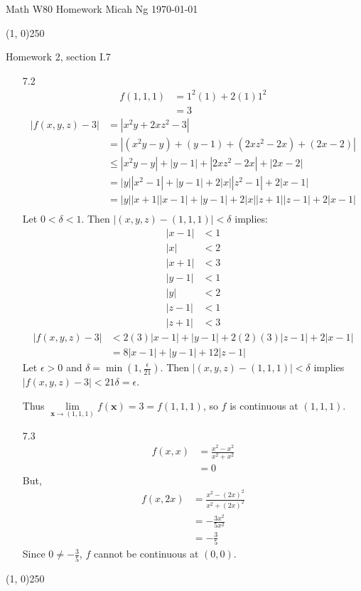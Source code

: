 \documentclass[11pt,letterpaper]{article}
\begin{document}
\noindent
Math W80 Homework \hfill Micah Ng \hfill \today

\begin{center}
\line(1, 0){250}
\end{center}

\noindent
Homework 2, section I.7

\begin{enumerate}
\item[7.2]
  \begin{align*}
    f(1,1,1) &= 1^2(1)+2(1)1^2 \\
        &= 3
  \end{align*}
  \begin{align*}
    |f(x,y,z)-3| &= \left|x^2y+2xz^2-3\right| \\
        &= \left|\left(x^2y-y\right)+(y-1)+\left(2xz^2-2x\right)+(2x-2)\right| \\
        &\leq \left|x^2y-y\right|+|y-1|+\left|2xz^2-2x\right|+|2x-2| \\
        &= |y|\left|x^2-1\right|+|y-1|+2|x|\left|z^2-1\right|+2|x-1| \\
        &= |y||x+1||x-1|+|y-1|+2|x||z+1||z-1|+2|x-1| \\
  \end{align*}
  Let $0<\delta<1$. Then $|(x,y,z)-(1,1,1)|<\delta$ implies:
  \begin{align*}
    |x-1| &< 1 \\
    |x| &< 2 \\
    |x+1| &< 3 \\
    |y-1| &< 1 \\
    |y| &< 2 \\
    |z-1| &< 1 \\
    |z+1| &< 3
  \end{align*}
  \begin{align*}
    |f(x,y,z)-3| &< 2(3)|x-1|+|y-1|+2(2)(3)|z-1|+2|x-1| \\
        &= 8|x-1|+|y-1|+12|z-1|
  \end{align*}
  Let $\epsilon>0$ and $\delta=\min\left(1,\frac{\epsilon}{21}\right)$. Then
  $|(x,y,z)-(1,1,1)|<\delta$ implies $|f(x,y,z)-3|<21\delta=\epsilon$.

  Thus $\lim\limits_{\mathbf{x}\to(1,1,1)}f(\mathbf{x})=3=f(1,1,1)$, so $f$ is
  continuous at $(1,1,1)$.

\item[7.3]
  \begin{align*}
    f(x,x) &= \frac{x^2-x^2}{x^2+x^2} \\
        &= 0
  \end{align*}
  But,
  \begin{align*}
    f(x,2x) &= \frac{x^2-(2x)^2}{x^2+(2x)^2} \\
        &= -\frac{3x^2}{5x^2} \\
        &= -\frac{3}{5}
  \end{align*}
  Since $0\neq-\frac{3}{5}$, $f$ cannot be continuous at $(0,0)$.
\end{enumerate}

\begin{center}
\line(1, 0){250}
\end{center}
\end{document}
